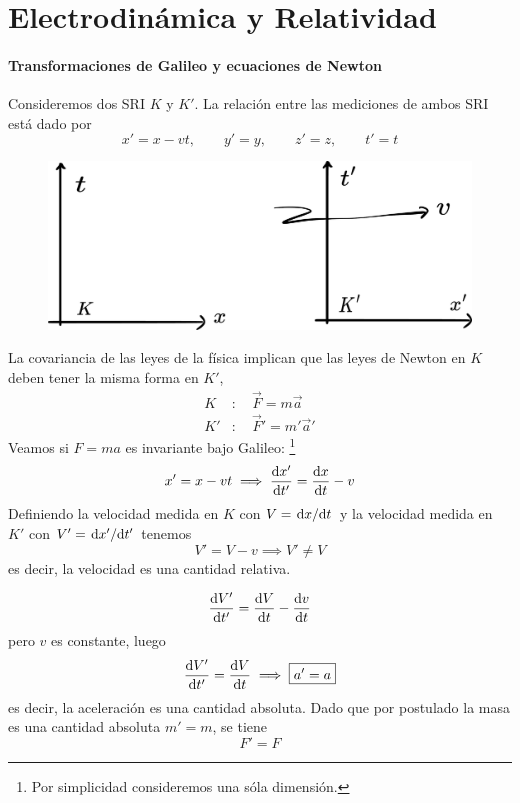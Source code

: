 \part{Electrodinámica y Relatividad}
\subsection{Transformaciones de Galileo y ecuaciones de Newton}
Consideremos dos SRI $K$ y $K'$. La relación entre las mediciones de ambos SRI está dado por
\begin{equation}
  x'=x-vt,\qquad y'=y,\qquad z'=z,\qquad t'=t
\end{equation}

\begin{figure}[h!]
	\centering
	\includegraphics[scale=0.2]{fig/Galileo.pdf}
\end{figure}

La covariancia de las leyes de la física implican que las leyes de Newton en $K$ deben tener la misma forma en $K'$,
\begin{align}
  K&:\quad \vec{F}=m\vec{a}\\
  K'&:\quad \vec{F}'=m'\vec{a}'
\end{align}
Veamos si $F=ma$ es invariante bajo Galileo: \footnote{Por simplicidad consideremos una sóla dimensión.}
\begin{equation}
  x'=x-vt\implies \dv{x'}{t'}=\dv{x}{t}-v
\end{equation}
Definiendo la velocidad medida en $K$ con $V=\dv*{x}{t}$ y la velocidad medida en $K'$ con $V'=\dv*{x'}{t'}$ tenemos
\begin{equation}
  V'=V-v\implies \boxed{V'\neq V}
\end{equation}
es decir, la velocidad es una cantidad relativa.

\begin{equation}
  \dv{V'}{t'}=\dv{V}{t}-\dv{v}{t}
\end{equation}
pero $v$ es constante, luego
\begin{equation}
  \dv{V'}{t'}=\dv{V}{t}\implies \boxed{a'=a}
\end{equation}
es decir, la aceleración es una cantidad absoluta. Dado que por postulado la masa es una cantidad absoluta $m'=m$, se tiene
\begin{equation}
\boxed{  F'=F}
\end{equation}

